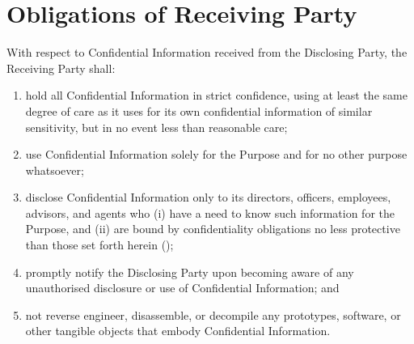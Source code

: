 \section{Obligations of Receiving Party}

\noindent
With respect to Confidential Information received from the Disclosing Party,
the Receiving Party shall:

\begin{enumerate}
  \item hold all Confidential Information in strict confidence, using at least
        the same degree of care as it uses for its own confidential information
        of similar sensitivity, but in no event less than reasonable care;
  \item use Confidential Information solely for the Purpose and for no other
        purpose whatsoever;
  \item disclose Confidential Information only to its directors, officers,
        employees, advisors, and agents who (i) have a need to know such
        information for the Purpose, and (ii) are bound by confidentiality
        obligations no less protective than those set forth herein
        ();
  \item promptly notify the Disclosing Party upon becoming aware of any
        unauthorised disclosure or use of Confidential Information; and
  \item not reverse engineer, disassemble, or decompile any prototypes,
        software, or other tangible objects that embody Confidential Information.
\end{enumerate}
